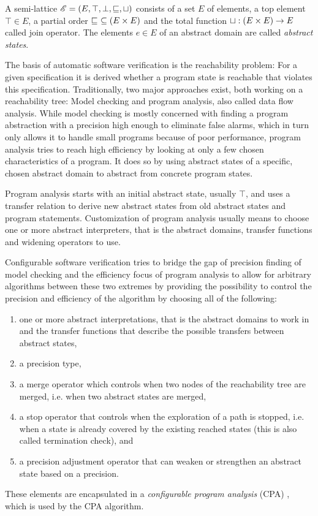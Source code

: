 A semi-lattice $\mathscr{E} = (E, \top, \bot, \sqsubseteq, \sqcup)$ consists of a set $E$ of elements, a top element $\top \in E$, a partial order $\sqsubseteq\ \subseteq (E \times E)$
and the total function $\sqcup : (E \times E) \rightarrow E$ called join operator. The elements $e \in E$ of an abstract domain are called \emph{abstract states}.

The basis of automatic software verification is the reachability problem: For a given specification it is derived whether a program state is reachable that violates this specification.
Traditionally, two major approaches exist, both working on a reachability tree: Model checking and program analysis, also called data flow analysis.
While model checking is mostly concerned with finding a program abstraction with a precision high enough to eliminate false alarms,
which in turn only allows it to handle small programs because of poor performance,
program analysis tries to reach high efficiency by looking at only a few chosen characteristics of a program. %
It does so by using abstract states of a specific, chosen abstract domain to abstract from concrete program states.

Program analysis starts with an initial abstract state, usually $\top$, and uses a transfer relation to derive new abstract states from old abstract states and program statements.
Customization of program analysis usually means to choose one or more abstract interpreters, that is the abstract domains, transfer functions and widening operators to use.\cite{Beyer2007}

Configurable software verification tries to bridge the gap of precision finding of model checking and the efficiency focus of program analysis to allow for arbitrary algorithms between these two extremes by providing the possibility to control the precision and efficiency of the algorithm by choosing all of the following:
\begin{enumerate}[label=\alph*)]
\item one or more abstract interpretations, that is the abstract domains to work in and the transfer functions that describe the possible transfers between abstract states,
\item a precision type,
\item a merge operator which controls when two nodes of the reachability tree are merged, i.e. when two abstract states are merged,
\item a stop operator that controls when the exploration of a path is stopped, i.e. when a state is already covered by the existing reached states (this is also called termination check), and
\item a precision adjustment operator that can weaken or strengthen an abstract state based on a precision.
\end{enumerate}
These elements are encapsulated in a \emph{configurable program analysis} (CPA) \cite{Beyer2008}, which is used by the CPA algorithm.

